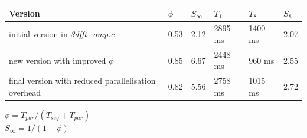 \documentclass[12]{article}
\begin{document}
\begin{table}[H]
\begin{tabular}{|l|l|l|l|l|l|}
\hline \textbf{Version} & $\phi $ & $S_\infty$ & $T_1$ & $T_8$ & $S_8$ \\ \hline
initial version in \textit{3dfft\_omp.c} & 0.53 & 2.12 & 2895 ms & 1400 ms & 2.07 \\ \hline
new version with improved $\phi$ & 0.85 & 6.67 & 2448 ms & 960 ms & 2.55 \\ \hline
final version with reduced parallelisation overhead & 0.82 & 5.56 & 2758 ms & 1015 ms & 2.72 \\ \hline

\end{tabular}
\begin{center}
$\phi = T_{par} / (T_{seq} + T_{par}) $ \\
$S_\infty = 1 / (1 - \phi) $
\end{center}
\end{table}

\end{document}
